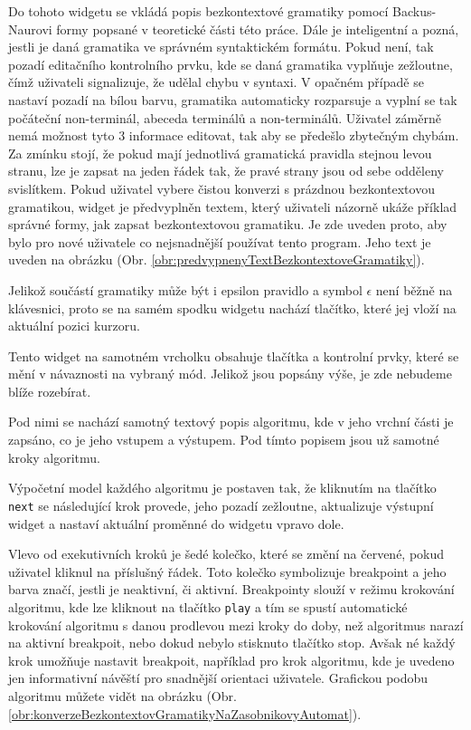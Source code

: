 Do tohoto widgetu se vkládá popis bezkontextové gramatiky pomocí Backus-Naurovi formy popsané v teoretické části této práce. Dále je inteligentní a pozná, jestli je daná gramatika ve správném syntaktickém formátu. Pokud není, tak pozadí editačního kontrolního prvku, kde se daná gramatika vyplňuje zežloutne, čímž uživateli signalizuje, že udělal chybu v syntaxi. V opačném případě se nastaví pozadí na bílou barvu, gramatika automaticky rozparsuje a vyplní se tak počáteční non-terminál, abeceda terminálů a non-terminálů. Uživatel záměrně nemá možnost tyto 3 informace editovat, tak aby se předešlo zbytečným chybám. Za zmínku stojí, že pokud mají jednotlivá gramatická pravidla stejnou levou stranu, lze je zapsat na jeden řádek tak, že pravé strany jsou od sebe odděleny svislítkem. Pokud uživatel vybere čistou konverzi s prázdnou bezkontextovou gramatikou, widget je předvyplněn textem, který uživateli názorně ukáže příklad správné formy, jak zapsat bezkontextovou gramatiku. Je zde uveden proto, aby bylo pro nové uživatele co nejsnadnější používat tento program. Jeho text je uveden na obrázku (Obr. \ref{obr:predvypnenyTextBezkontextoveGramatiky}). 

Jelikož součástí gramatiky může být i epsilon pravidlo a symbol $\epsilon$ není běžně na klávesnici, proto se na samém spodku widgetu nachází tlačítko, které jej vloží na aktuální pozici kurzoru.  



Tento widget na samotném vrcholku obsahuje tlačítka a kontrolní prvky, které se mění v návaznosti na vybraný mód. Jelikož jsou popsány výše, je zde nebudeme blíže rozebírat.

Pod nimi se nachází samotný textový popis algoritmu, kde v jeho vrchní části je zapsáno, co je jeho vstupem a výstupem. Pod tímto popisem jsou už samotné kroky algoritmu.

Výpočetní model každého algoritmu je postaven tak, že kliknutím na tlačítko \texttt{next} se následující krok provede, jeho pozadí zežloutne, aktualizuje výstupní widget a nastaví aktuální proměnné do widgetu vpravo dole. 

Vlevo od exekutivních kroků je šedé kolečko, které se změní na červené, pokud uživatel kliknul na příslušný řádek. Toto kolečko symbolizuje breakpoint a jeho barva značí, jestli je neaktivní, či aktivní. Breakpointy slouží v režimu krokování algoritmu, kde lze kliknout na tlačítko \texttt{play} a tím se spustí automatické krokování algoritmu s danou prodlevou mezi kroky do doby, než algoritmus narazí na aktivní breakpoit, nebo dokud nebylo stisknuto tlačítko stop. Avšak né každý krok umožňuje nastavit breakpoit, například pro krok algoritmu, kde je uvedeno jen informativní návěští pro snadnější orientaci uživatele. Grafickou podobu algoritmu můžete vidět na obrázku (Obr. \ref{obr:konverzeBezkontextovGramatikyNaZasobnikovyAutomat}).

